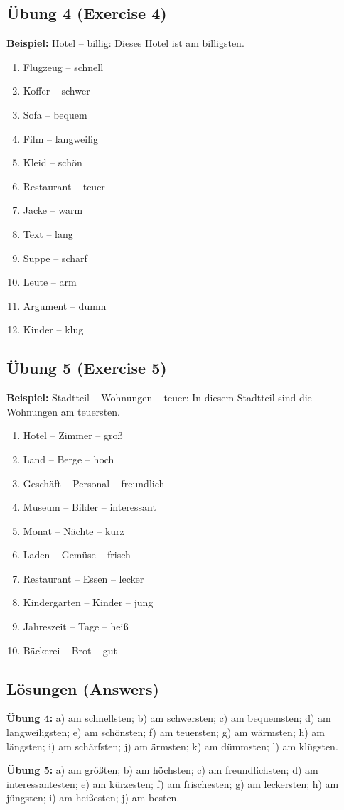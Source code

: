 \subsection{Übung 4 (Exercise 4)}
\textbf{Beispiel:} Hotel -- billig: Dieses Hotel ist am billigsten.
\begin{enumerate}
\item Flugzeug -- schnell
\item Koffer -- schwer
\item Sofa -- bequem
\item Film -- langweilig
\item Kleid -- schön
\item Restaurant -- teuer
\item Jacke -- warm
\item Text -- lang
\item Suppe -- scharf
\item Leute -- arm
\item Argument -- dumm
\item Kinder -- klug
\end{enumerate}
\subsection{Übung 5 (Exercise 5)}
\textbf{Beispiel:} Stadtteil -- Wohnungen -- teuer: In diesem Stadtteil sind die Wohnungen am teuersten.
\begin{enumerate}
\item Hotel -- Zimmer -- groß
\item Land -- Berge -- hoch
\item Geschäft -- Personal -- freundlich
\item Museum -- Bilder -- interessant
\item Monat -- Nächte -- kurz
\item Laden -- Gemüse -- frisch
\item Restaurant -- Essen -- lecker
\item Kindergarten -- Kinder -- jung
\item Jahreszeit -- Tage -- heiß
\item Bäckerei -- Brot -- gut
\end{enumerate}
\subsection{Lösungen (Answers)}
\textbf{Übung 4:} a) am schnellsten; b) am schwersten; c) am bequemsten; d) am langweiligsten; e) am schönsten; f) am teuersten; g) am wärmsten; h) am längsten; i) am schärfsten; j) am ärmsten; k) am dümmsten; l) am klügsten.

\textbf{Übung 5:} a) am größten; b) am höchsten; c) am freundlichsten; d) am interessantesten; e) am kürzesten; f) am frischesten; g) am leckersten; h) am jüngsten; i) am heißesten; j) am besten.
